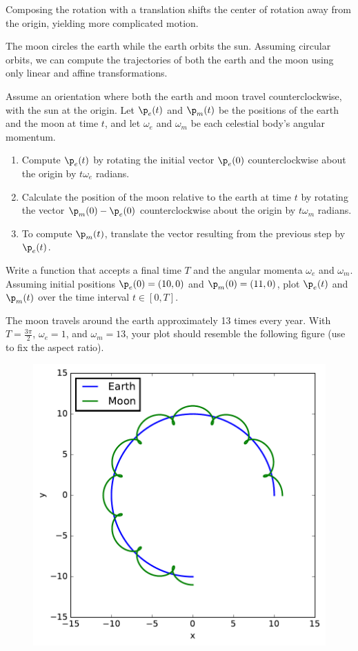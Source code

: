 Composing the rotation with a translation shifts the center of rotation away from the origin, yielding more complicated motion.

\begin{problem} %
The moon circles the earth while the earth orbits the sun.
Assuming circular orbits, we can compute the trajectories of both the earth and the moon using only linear and affine transformations.

Assume an orientation where both the earth and moon travel counterclockwise, with the sun at the origin.
Let $\p_e(t)$ and $\p_m(t)$ be the positions of the earth and the moon at time $t$, and let $\omega_e$ and $\omega_m$ be each celestial body's angular momentum.

\begin{enumerate}
\item Compute $\p_e(t)$ by rotating the initial vector $\p_e(0)$ counterclockwise about the origin by $t\omega_e$ radians.
\item Calculate the position of the moon relative to the earth at time $t$ by rotating the vector $\p_m(0) - \p_e(0)$ counterclockwise about the origin by $t\omega_m$ radians.
\item To compute $\p_m(t)$, translate the vector resulting from the previous step by $\p_e(t)$.
\end{enumerate}

Write a function that accepts a final time $T$ and the angular momenta $\omega_e$ and $\omega_m$.
Assuming initial positions $\p_e(0) = (10,0)$ and $\p_m(0) = (11,0)$, plot $\p_e(t)$ and $\p_m(t)$ over the time interval $t \in [0, T]$.

The moon travels around the earth approximately 13 times every year.
With $T = \frac{3\pi}{2}$, $\omega_e = 1$, and $\omega_m = 13$, your plot should resemble the following figure (use  to fix the aspect ratio).
\\
\begin{figure}[H]
    \includegraphics[width=.7\textwidth]{figures/SolarSystem.pdf}
\end{figure}

\label{prob:solar-system-trajectories}
\end{problem}

